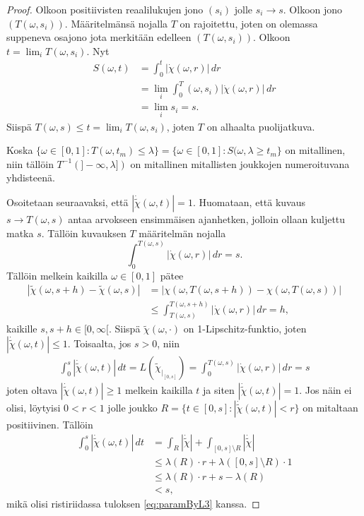 \documentclass[12pt,oneside,a4paper]{amsbook} %
\begin{document}
\begin{proof}
    Olkoon positiivisten reaalilukujen jono $(s_i)$ jolle $s_i \to s$. Olkoon jono $(T(\omega, s_i))$. Määritelmänsä nojalla $T$ on rajoitettu, joten on olemassa suppeneva osajono jota merkitään edelleen $(T(\omega, s_i))$. Olkoon $t = \lim_i T(\omega, s_i)$. Nyt
    \begin{align*}
        S(\omega, t) &= \int_0^t |\dot\chi(\omega, r)| \, dr \\
        &= \lim_i\int_0^T(\omega, s_i) |\dot\chi(\omega, r)| \, dr \\
        &= \lim_i s_i = s.
    \end{align*}
    Siispä $T(\omega, s) \le t = \lim_i T(\omega, s_i)$, joten $T$ on alhaalta puolijatkuva.
    
    Koska $\{\omega \in [0, 1] : T(\omega, t_m) \le \lambda\} = \{\omega\in [0, 1] : S(\omega, \lambda \ge t_m\}$ on mitallinen, niin tällöin $T^{-1}(]-\infty, \lambda])$ on mitallinen mitallisten joukkojen numeroituvana yhdisteenä.
    
    Osoitetaan seuraavaksi, että $|\dot{\tilde{\chi}}(\omega, t)| = 1$. Huomataan, että kuvaus $s\to T(\omega, s)$ antaa arvokseen ensimmäisen ajanhetken, jolloin ollaan kuljettu matka $s$. Tällöin kuvauksen $T$ määritelmän nojalla 
    \begin{equation} \label{eq:paramByL1}
        \int_0^{T(\omega,s)} |\dot \chi(\omega, r)| \, dr = s.
    \end{equation}
    Tällöin melkein kaikilla $\omega \in [0, 1]$ pätee
    \begin{align*}
        |\tilde\chi(\omega, s + h) - \tilde\chi(\omega, s)| &= |\chi(\omega, T(\omega, s+h)) - \chi(\omega, T(\omega, s))| \\
        &\le \int_{T(\omega,s)}^{T(\omega, s+h)}|\dot \chi(\omega, r)| \, dr = h,
    \end{align*}
    kaikille $s, s+h \in [0, \infty[$. Siispä $\tilde \chi(\omega, \cdot)$ on 1-Lipschitz-funktio, joten $|\dot{\tilde \chi}(\omega, t)| \le 1$. Toisaalta, jos $s > 0$, niin
    \begin{align}
        \label{eq:paramByL3} \int_0^s |\dot{\tilde \chi}(\omega, t)| \, dt = L(\tilde\chi_{|_{[0, s]}})= \int_0^{T(\omega, s)} |\dot \chi(\omega, r)| \, dr = s
    \end{align}
    joten oltava $|\dot{\tilde \chi}(\omega, t)| \ge 1$ melkein kaikilla $t$ ja siten $|\dot{\tilde \chi}(\omega, t)| = 1$. Jos näin ei olisi, löytyisi $0 < r < 1$ jolle joukko $R = \{t \in [0, s] : |\dot{\tilde \chi}(\omega, t)|< r\}$ on mitaltaan positiivinen. Tällöin
    \begin{align*}
        \int_0^s |\dot{\tilde \chi}(\omega, t)| \, dt &= \int_R |\dot{\tilde \chi}| + \int_{[0,s]\setminus R} |\dot{\tilde \chi}| \\
        &\le \lambda(R) \cdot r + \lambda([0,s]\setminus R) \cdot 1 \\
        &\le \lambda(R) \cdot r + s - \lambda(R) \\
        &< s,
    \end{align*}
    mikä olisi ristiriidassa tuloksen \eqref{eq:paramByL3} kanssa.


\end{proof}
\end{document}
